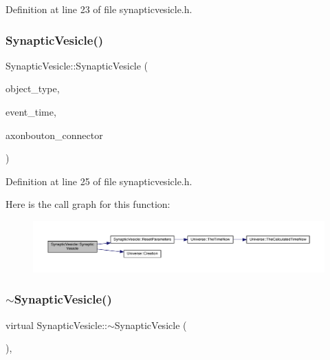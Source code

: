 Definition at line 23 of file synapticvesicle.\+h.

\mbox{\label{class_synaptic_vesicle_a0f86278b771137978d03bb6cf460a527}} 
\subsubsection{\texorpdfstring{Synaptic\+Vesicle()}{SynapticVesicle()}\hspace{0.1cm}{\footnotesize\ttfamily [4/4]}}
{\footnotesize\ttfamily Synaptic\+Vesicle\+::\+Synaptic\+Vesicle (\begin{DoxyParamCaption}\item[{unsigned int}]{object\+\_\+type,  }\item[{std\+::chrono\+::time\+\_\+point$<$ \mbox{\hyperlink{universe_8h_a0ef8d951d1ca5ab3cfaf7ab4c7a6fd80}{Clock}} $>$}]{event\+\_\+time,  }\item[{\mbox{\hyperlink{class_axon_bouton}{Axon\+Bouton}} \&}]{axonbouton\+\_\+connector }\end{DoxyParamCaption})\hspace{0.3cm}{\ttfamily [inline]}}



Definition at line 25 of file synapticvesicle.\+h.

Here is the call graph for this function\+:\nopagebreak
\begin{figure}[H]
\begin{center}
\leavevmode
\includegraphics[width=350pt]{class_synaptic_vesicle_a0f86278b771137978d03bb6cf460a527_cgraph}
\end{center}
\end{figure}
\mbox{\label{class_synaptic_vesicle_a9bbc23a1c9757d8522a10bb28e0f575b}} 
\subsubsection{\texorpdfstring{$\sim$\+Synaptic\+Vesicle()}{~SynapticVesicle()}}
{\footnotesize\ttfamily virtual Synaptic\+Vesicle\+::$\sim$\+Synaptic\+Vesicle (\begin{DoxyParamCaption}{ }\end{DoxyParamCaption})\hspace{0.3cm}{\ttfamily [inline]}, {\ttfamily [virtual]}}

